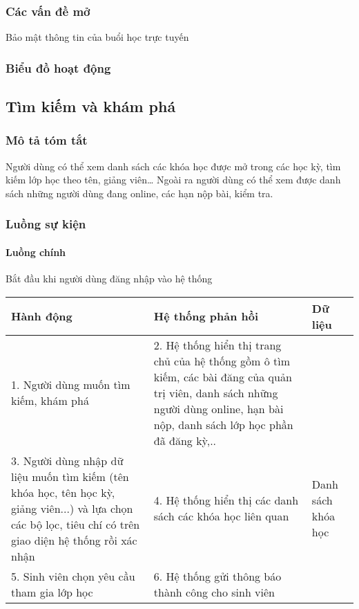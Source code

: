 \documentclass[./../main_file.tex]{subfiles}
\begin{document}
\subsubsection{Các vấn đề mở}
Bảo mật thông tin của buổi học trực tuyến

\subsubsection{Biểu đồ hoạt động}

\subsection{Tìm kiếm và khám phá}
\subsubsection{Mô tả tóm tắt}
Người dùng có thể xem danh sách các khóa học được mở trong các học kỳ, tìm kiếm lớp học theo tên, giảng viên… Ngoài ra người dùng có thể xem được danh sách những người dùng đang online, các hạn nộp bài, kiểm tra.

\subsubsection{Luồng sự kiện}
\paragraph{Luồng chính}
Bắt đầu khi người dùng đăng nhập vào hệ thống
\begin{table}[H]
				\begin{tabular}{|p{.33\textwidth}|p{}|p{}|}
		\hline
		\textbf{Hành động}                          & \textbf{Hệ thống phản hồi}                         & \textbf{Dữ liệu} \\ \hline
		1. Người dùng muốn tìm kiếm, khám phá &
		2. Hệ thống hiển thị trang chủ của hệ thống gồm ô tìm kiếm, các bài đăng của quản trị viên, danh sách những người dùng online, hạn bài nộp, danh sách lớp học phần đã đăng kỳ,.. &
		\\ \hline
		3. Người dùng nhập dữ liệu muốn tìm kiếm (tên khóa học, tên học kỳ, giảng viên...) và lựa chọn các bộ lọc, tiêu chí có trên giao diện hệ thống rồi xác nhận &
		4. Hệ thống hiển thị các danh sách các khóa học liên quan &
		Danh sách khóa học \\ \hline
		5. Sinh viên chọn  yêu cầu tham gia lớp học & 6. Hệ thống gửi thông báo thành công cho sinh viên &                  \\ \hline
	\end{tabular}
\end{table}
\end{document}

